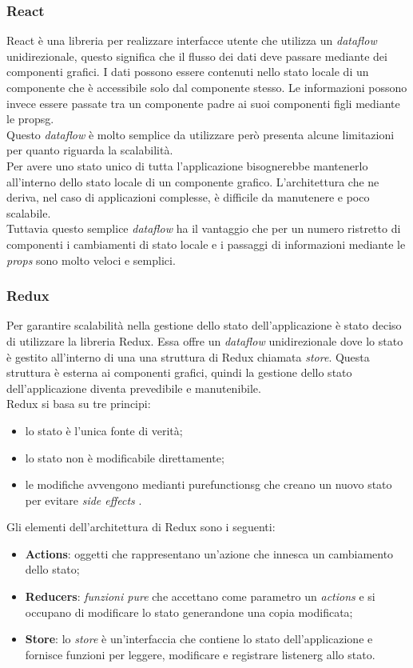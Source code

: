 \subsubsection*{React}
React è una libreria per realizzare interfacce utente che utilizza un \emph{dataflow} unidirezionale, questo significa che il flusso dei dati deve passare mediante dei componenti grafici. I dati possono essere contenuti nello stato locale di un componente che è accessibile solo dal componente stesso. Le informazioni possono invece essere passate tra un componente padre ai suoi componenti figli mediante le \gls{propsg}. \\
Questo \emph{dataflow} è molto semplice da utilizzare però presenta alcune limitazioni per quanto riguarda la scalabilità. \\
Per avere uno stato unico di tutta l'applicazione bisognerebbe mantenerlo all'interno dello stato locale di un componente grafico. L'architettura che ne deriva, nel caso di applicazioni complesse, è difficile da manutenere e poco scalabile. \\
Tuttavia questo semplice \emph{dataflow} ha il vantaggio che per un numero ristretto di componenti i cambiamenti di stato locale e i passaggi di informazioni mediante le \emph{props} sono molto veloci e semplici.

\subsubsection*{Redux}
Per garantire scalabilità nella gestione dello stato dell'applicazione è stato deciso di utilizzare la libreria Redux. Essa offre un \emph{dataflow} unidirezionale dove lo stato è gestito all'interno di una una struttura di Redux chiamata \emph{store}. Questa struttura è esterna ai componenti grafici, quindi la gestione dello stato dell'applicazione diventa prevedibile e manutenibile. \\
Redux si basa su tre principi:
\begin{itemize}
	\item lo stato è l'unica fonte di verità;
	\item lo stato non è modificabile direttamente;
	\item le modifiche avvengono medianti \gls{purefunctionsg} che creano un nuovo stato per evitare \emph{side effects} .
\end{itemize}

\noindent
Gli elementi dell'architettura di Redux sono i seguenti:
\begin{itemize}
	\item \textbf{Actions}: oggetti che rappresentano un'azione che innesca un cambiamento dello stato;
	\item \textbf{Reducers}: \emph{funzioni pure} che accettano come parametro un \emph{actions} e si occupano di modificare lo stato generandone una copia modificata;
	\item \textbf{Store}: lo \emph{store} è un'interfaccia che contiene lo stato dell'applicazione e fornisce funzioni per leggere, modificare e registrare \gls{listenerg} allo stato.
\end{itemize}

